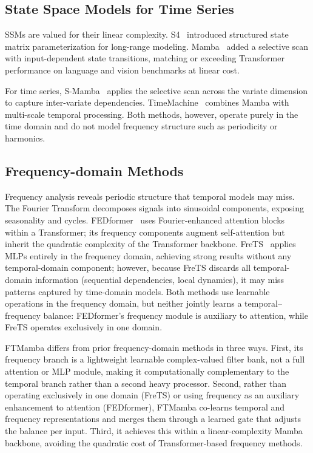 \documentclass[electronics,article,submit,pdftex,moreauthors]{Definitions/mdpi}
\begin{document}
\subsection{State Space Models for Time Series}

SSMs are valued for their linear complexity. S4~\cite{ref15} introduced structured state matrix parameterization for long-range modeling. Mamba~\cite{ref10} added a selective scan with input-dependent state transitions, matching or exceeding Transformer performance on language and vision benchmarks at linear cost.

For time series, S-Mamba~\cite{ref11} applies the selective scan across the variate dimension to capture inter-variate dependencies. TimeMachine~\cite{ref12} combines Mamba with multi-scale temporal processing. Both methods, however, operate purely in the time domain and do not model frequency structure such as periodicity or harmonics.

\subsection{Frequency-domain Methods}

Frequency analysis reveals periodic structure that temporal models may miss. The Fourier Transform decomposes signals into sinusoidal components, exposing seasonality and cycles. FEDformer~\cite{ref7} uses Fourier-enhanced attention blocks within a Transformer; its frequency components augment self-attention but inherit the quadratic complexity of the Transformer backbone. FreTS~\cite{ref16} applies MLPs entirely in the frequency domain, achieving strong results without any temporal-domain component; however, because FreTS discards all temporal-domain information (sequential dependencies, local dynamics), it may miss patterns captured by time-domain models. Both methods use learnable operations in the frequency domain, but neither jointly learns a temporal--frequency balance: FEDformer's frequency module is auxiliary to attention, while FreTS operates exclusively in one domain.

FTMamba differs from prior frequency-domain methods in three ways. First, its frequency branch is a lightweight learnable complex-valued filter bank, not a full attention or MLP module, making it computationally complementary to the temporal branch rather than a second heavy processor. Second, rather than operating exclusively in one domain (FreTS) or using frequency as an auxiliary enhancement to attention (FEDformer), FTMamba co-learns temporal and frequency representations and merges them through a learned gate that adjusts the balance per input. Third, it achieves this within a linear-complexity Mamba backbone, avoiding the quadratic cost of Transformer-based frequency methods.
\end{document}

